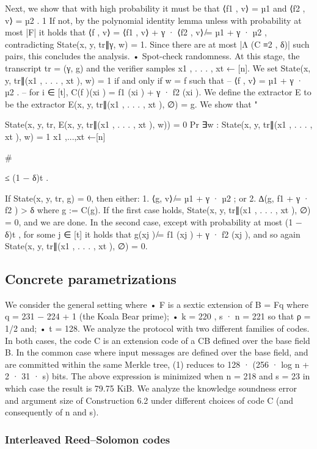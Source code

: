 \documentclass[11pt]{article}
\begin{document}
Next, we show that with high probability it must be that ⟨f1 , v⟩ = µ1 and ⟨f2 , v⟩ = µ2 .
1
If not, by the polynomial identity lemma unless with probability at most |F|
it holds that
⟨f , v⟩ = ⟨f1 , v⟩ + γ · ⟨f2 , v⟩ ̸= µ1 + γ · µ2 , contradicting State(x, y, tr∥γ, w) = 1. Since there are
at most |Λ (C ≡2 , δ)| such pairs, this concludes the analysis.
• Spot-check randomness. At this stage, the transcript tr = (γ, g) and the verifier samples
x1 , . . . , xt ← [n]. We set State(x, y, tr∥(x1 , . . . , xt ), w) = 1 if and only if w = f such that
– ⟨f , v⟩ = µ1 + γ · µ2 .
– for i ∈ [t], C(f )(xi ) = f1 (xi ) + γ · f2 (xi ).
We define the extractor E to be the extractor E(x, y, tr∥(x1 , . . . , xt ), ∅) = g.
We show that
"

State(x, y, tr, E(x, y, tr∥(x1 , . . . , xt ), w)) = 0
Pr
∃w :
State(x, y, tr∥(x1 , . . . , xt ), w) = 1
x1 ,...,xt ←[n]

\#

≤ (1 − δ)t .

If State(x, y, tr, g) = 0, then either:
1. ⟨g, v⟩ ̸= µ1 + γ · µ2 ; or
2. ∆(g, f1 + γ · f2 ) > δ where g := C(g).
If the first case holds, State(x, y, tr∥(x1 , . . . , xt ), ∅) = 0, and we are done. In the second case,
except with probability at most (1 − δ)t , for some j ∈ [t] it holds that g(xj ) ̸= f1 (xj ) + γ · f2 (xj ),
and so again State(x, y, tr∥(x1 , . . . , xt ), ∅) = 0.


\subsection{Concrete parametrizations}



We consider the general setting where
• F is a sextic extension of B = Fq where q = 231 − 224 + 1 (the Koala Bear prime);
• k = 220 , s · n = 221 so that ρ = 1/2 and;
• t = 128.
We analyze the protocol with two different families of codes. In both cases, the code C is an
extension code of a CB defined over the base field B. In the common case where input messages are
defined over the base field, and are committed within the same Merkle tree, (1) reduces to
128 · (256 · log n + 2 · 31 · s) bits.
The above expression is minimized when n = 218 and s = 23 in which case the result is 79.75 KiB.
We analyze the knowledge soundness error and argument size of Construction 6.2 under different
choices of code C (and consequently of n and s).

\subsubsection{Interleaved Reed–Solomon codes}
\end{document}
